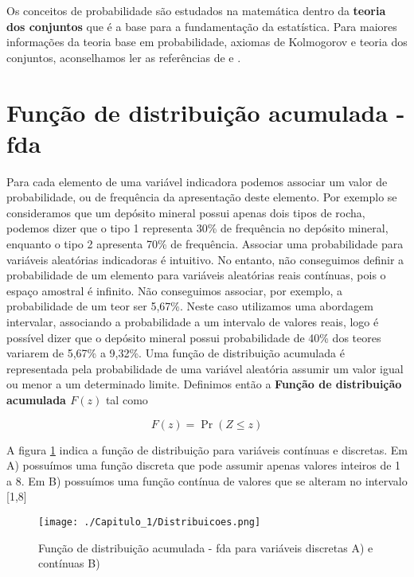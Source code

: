     Os conceitos de probabilidade são estudados na matemática dentro da \textbf{teoria dos conjuntos}  que é a base para a fundamentação da estatística. Para maiores informações da teoria base em probabilidade, axiomas de Kolmogorov e teoria dos conjuntos, aconselhamos ler as referências de \citet{alencar2014teoria} e \citet{feitosa2011teoria}.
 
 \section{Função de distribuição acumulada - fda}  
 
Para cada elemento de uma variável indicadora podemos associar um valor de probabilidade, ou de frequência da apresentação deste elemento. Por exemplo se consideramos que um depósito mineral possui apenas dois tipos de rocha, podemos dizer que o tipo 1 representa 30\% de frequência no depósito mineral, enquanto o tipo 2 apresenta 70\% de frequência. Associar uma probabilidade para variáveis aleatórias indicadoras é intuitivo. No entanto, não conseguimos definir a probabilidade de um elemento para variáveis aleatórias reais contínuas, pois o espaço amostral é infinito. Não conseguimos associar, por exemplo, a probabilidade de um teor ser 5,67\%. Neste caso utilizamos uma abordagem intervalar, associando a probabilidade a um intervalo de valores reais, logo é possível dizer que o depósito mineral possui probabilidade de 40\% dos teores variarem de 5,67\% a 9,32\%. Uma função de distribuição acumulada é representada pela probabilidade de uma variável aleatória assumir um valor igual ou menor a um determinado limite. Definimos então a \textbf{Função de distribuição acumulada $F(z)$} tal como  

\begin{equation}
F(z) = \Pr(Z \leqslant z)
\end{equation}

A figura \ref{distribuicoes} indica a função de distribuição para variáveis contínuas e discretas. Em A) possuímos uma função discreta que pode assumir apenas valores inteiros de 1 a 8. Em B) possuímos uma função contínua de valores que se alteram no intervalo [1,8]
	
	
\FloatBarrier
\begin{figure}[!htb]
	\centering
	\texttt{[image: ./Capitulo\_1/Distribuicoes.png]}	
	\caption{Função de distribuição acumulada - fda para variáveis discretas A) e contínuas B) }
	\label{distribuicoes}
\end{figure}
\FloatBarrier

